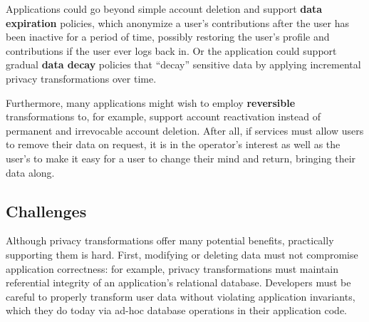 %
Applications could go beyond simple account deletion and support \textbf{data
expiration} policies, which anonymize a user's contributions after the user has been inactive for a
period of time, possibly restoring the user's profile and contributions if the user ever logs back
in.
%
Or the application could support gradual \textbf{data decay} policies that ``decay'' sensitive data
by applying incremental privacy transformations over time.

Furthermore, many applications might wish to employ \textbf{reversible} transformations to, for
example, support account reactivation instead of permanent and irrevocable account deletion.
%
After all, if services must allow users to remove their data on request, it is in the operator's
interest as well as the user's to make it easy for a user to change their mind and return, bringing
their data along.

\subsection{Challenges}
%
Although privacy transformations offer many potential benefits, practically supporting them is hard.
First, modifying or deleting data must not compromise application correctness: for example, privacy
transformations must maintain referential integrity of an application's relational database.
Developers must be careful to properly transform user data without violating application invariants,
%
which they do today via ad-hoc database operations in their application code.

